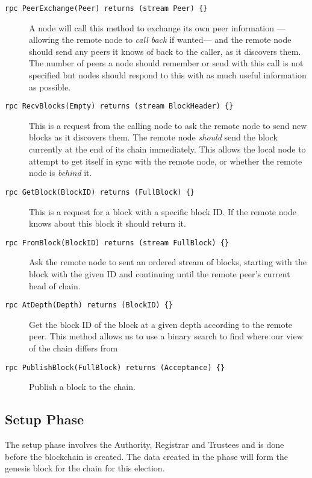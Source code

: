 \begin{description}
    \item[\texttt{rpc PeerExchange(Peer) returns (stream Peer) \{\}}] A node will call this method to exchange its own peer information ---allowing the remote node to \emph{call back} if wanted--- and the remote node should send any peers it knows of back to the caller, as it discovers them. The number of peers a node should remember or send with this call is not specified but nodes should respond to this with as much useful information as possible.
    \item[\texttt{rpc RecvBlocks(Empty) returns (stream BlockHeader) \{\}}] This is a request from the calling node to ask the remote node to send new blocks as it discovers them. The remote node \emph{should} send the block currently at the end of its chain immediately. This allows the local node to attempt to get itself in sync with the remote node, or whether the remote node is \emph{behind} it.
    \item[\texttt{rpc GetBlock(BlockID) returns (FullBlock) \{\}}] This is a request for a block with a specific block ID. If the remote node knows about this block it should return it.
    \item[\texttt{rpc FromBlock(BlockID) returns (stream FullBlock) \{\}}] Ask the remote node to sent an ordered stream of blocks, starting with the block with the given ID and continuing until the remote peer's current head of chain.
    \item[\texttt{rpc AtDepth(Depth) returns (BlockID) \{\}}] Get the block ID of the block at a given depth according to the remote peer. This method allows us to use a binary search to find where our view of the chain differs from
    \item[\texttt{rpc PublishBlock(FullBlock) returns (Acceptance) \{\}}] Publish a block to the chain.
\end{description}


\subsection{Setup Phase}
\label{ch:astris:detail:setup}

The setup phase involves the Authority, Registrar and Trustees and is done before the blockchain is created. The data created in the phase will form the genesis block for the chain for this election.

